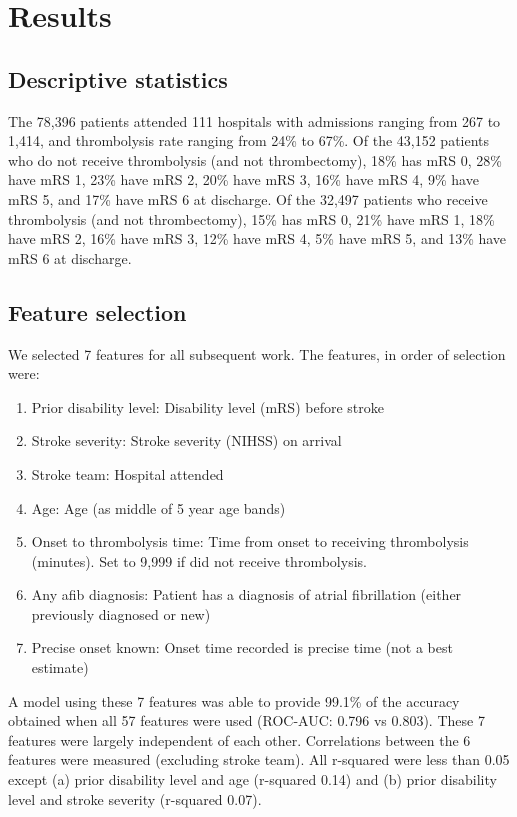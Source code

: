 \section{Results}

\subsection{Descriptive statistics}

The 78,396 patients attended 111 hospitals with admissions ranging from 267 to 1,414, and thrombolysis rate ranging from 24\% to 67\%. Of the 43,152 patients who do not receive thrombolysis (and not thrombectomy), 18\% has mRS 0, 28\% have mRS 1, 23\% have mRS 2, 20\% have mRS 3, 16\% have mRS 4, 9\% have mRS 5, and 17\% have mRS 6 at discharge. Of the 32,497 patients who receive thrombolysis (and not thrombectomy), 15\% has mRS 0, 21\% have mRS 1, 18\% have mRS 2, 16\% have mRS 3, 12\% have mRS 4, 5\% have mRS 5, and 13\% have mRS 6 at discharge.

\subsection{Feature selection}

We selected 7 features for all subsequent work. The features, in order of selection were:

\begin{enumerate}
    \item Prior disability level: Disability level (mRS) before stroke
    \item Stroke severity: Stroke severity (NIHSS) on arrival
    \item Stroke team: Hospital attended
    \item Age: Age (as middle of 5 year age bands)
    \item Onset to thrombolysis time: Time from onset to receiving thrombolysis (minutes). Set to 9,999 if did not receive thrombolysis.
    \item Any afib diagnosis: Patient has a diagnosis of atrial fibrillation (either previously diagnosed or new)
    \item Precise onset known: Onset time recorded is precise time (not a best estimate)
\end{enumerate}

A model using these 7 features was able to provide 99.1\% of the accuracy obtained when all 57 features were used (ROC-AUC: 0.796 vs 0.803). These 7 features were largely independent of each other. Correlations between the 6 features were measured (excluding stroke team). All r-squared were less than 0.05 except (a) prior disability level and age (r-squared 0.14) and (b) prior disability level and stroke severity (r-squared 0.07).

